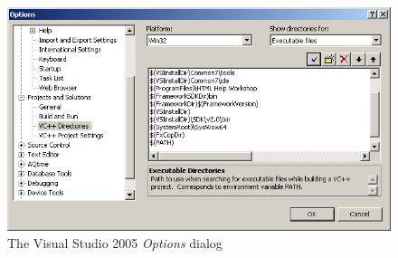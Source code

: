 \documentclass[a4paper,titlepage]{report}
\begin{document}
\begin{figure}[h]
    \centering
    \caption{The Visual Studio 2005 \emph{Options} dialog\label{fig:VisualStudioOptionsDialog}}
    \includegraphics[width=\textwidth]{./VS2005_ExeDirs.png}
\end{figure}

\pagebreak{}\tableofcontents\thispagestyle{fancy}
\end{document}
